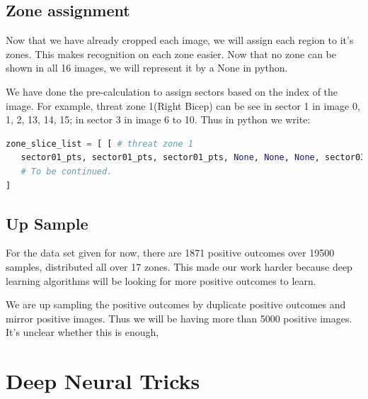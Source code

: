 \documentclass[conference,compsoc]{IEEEtran}
\begin{document}
	\subsection{Zone assignment}
		\par Now that we have already cropped each image, we will assign each region to it's zones. This makes recognition on each zone easier. Now that no zone can be shown in all 16 images, we will represent it by a None in python.
		\par We have done the pre-calculation to assign sectors based on the index of the image. For example, threat zone 1(Right Bicep) can be see in sector 1 in image 0, 1, 2, 13, 14, 15; in sector 3 in image 6 to 10. Thus in python we write:
		\begin{lstlisting}[language = python]
zone_slice_list = [ [ # threat zone 1
   sector01_pts, sector01_pts, sector01_pts, None, None, None, sector03_pts, sector03_pts, sector03_pts, sector03_pts, sector03_pts, None, None, sector01_pts, sector01_pts, sector01_pts ],
   # To be continued.
]
		\end{lstlisting}
	\subsection{Up Sample}
		\par For the data set given for now, there are 1871 positive outcomes over 19500 samples, distributed all over 17 zones. This made our work harder because deep learning algorithms will be looking for more positive outcomes to learn. 
		\par We are up sampling the positive outcomes by duplicate positive outcomes and mirror positive images. Thus we will be having more than 5000 positive images. It's unclear whether this is enough, 
\section{Deep Neural Tricks}


% 
\end{document}
